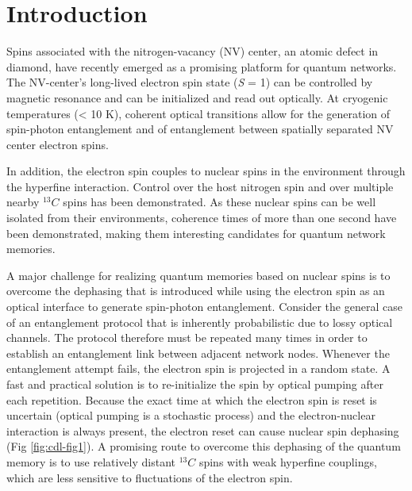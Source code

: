 \section{Introduction}

Spins associated with the nitrogen-vacancy (NV) center, an atomic defect in diamond, have recently emerged as a promising platform for quantum networks\cite{Gao_NatPhoton_2015,Childress__2013}. The NV-center’s long-lived electron spin state (\textit{S} = 1) can be controlled by magnetic resonance and can be initialized and read out optically. At cryogenic temperatures (< 10 K), coherent optical transitions allow for the generation of spin-photon entanglement\cite{Togan_Nature_2010} and of entanglement between spatially separated NV center electron spins\cite{Bernien_Nature_2013,Pfaff_Science_2014}. 

In addition, the electron spin couples to nuclear spins in the environment through the hyperfine interaction. Control over the host nitrogen spin and over multiple nearby $^{13}C$ spins has been demonstrated\cite{Jelezko_Phys.Rev.Lett._2004,Dutt_Science_2007,Neumann_Science_2008a,Smeltzer_Phys.Rev.A_2009,Fuchs_NatPhys_2011,vanderSar_Nature_2012,Taminiau_Phys.Rev.Lett._2012}. As these nuclear spins can be well isolated from their environments, coherence times of more than one second have been demonstrated\cite{Maurer_Science_2012}, making them interesting candidates for quantum network memories. 

A major challenge for realizing quantum memories based on nuclear spins is to overcome the dephasing that is introduced while using the electron spin as an optical interface to generate spin-photon entanglement. Consider the general case of an entanglement protocol that is inherently probabilistic due to lossy optical channels. The protocol therefore must be repeated many times in order to establish an entanglement link between adjacent network nodes. Whenever the entanglement attempt fails, the electron spin is projected in a random state. A fast and practical solution is to re-initialize the spin by optical pumping after each repetition. Because the exact time at which the electron spin is reset is uncertain (optical pumping is a stochastic process) and the electron-nuclear interaction is always present, the electron reset can cause nuclear spin dephasing (Fig \ref{fig:cdl-fig1}). A promising route to overcome this dephasing of the quantum memory is to use relatively distant $^{13}C$ spins with weak hyperfine couplings, which are less sensitive to fluctuations of the electron spin.  

